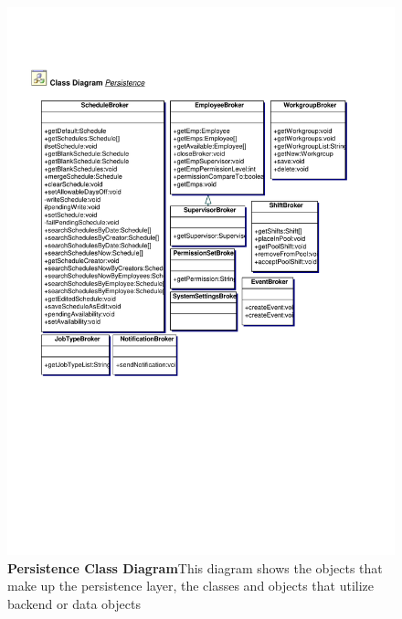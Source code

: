 \documentclass[letterpaper,12pt]{report}
\begin{document}
\begin{figure}[persistdomainClassDia]
 \centering
 \includegraphics[scale=0.7,trim=20mm 40mm 25mm 50mm]{externals/PersistenceClassDiagram.pdf}
 \caption{\small
\textbf{Persistence Class Diagram}\newline This diagram shows the objects that make up the persistence layer, the classes and objects that utilize backend or data objects}\label{fig:persclassdia}
\end{figure}
\newpage
\end{document}
